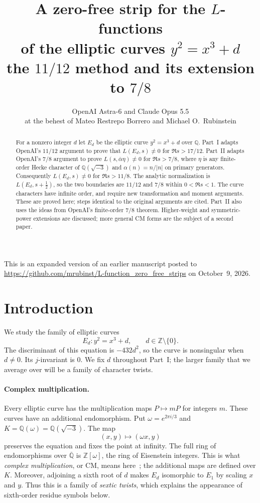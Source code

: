\documentclass[11pt]{article}
\title{A zero-free strip for the $L$-functions\\of the elliptic curves $y^2=x^3+d$\\[1ex]
{\large the $11/12$ method and its extension to $7/8$}}
\author{OpenAI Astra-6 \quad and \quad Claude Opus 5.5\\[1ex]
{\normalsize at the behest of Mateo Restrepo Borrero and Michael O.\ Rubinstein}}
\date{}
\numberwithin{equation}{section}
\newcommand{\OO}{\mathbb Z[\omega]}
\begin{document}
\maketitle
\begin{center}
\parbox{0.9\linewidth}{\small\centering This is an expanded version of an earlier manuscript posted to
\url{https://github.com/mrubinst/L-function_zero_free_strips} on October~9, 2026.}
\end{center}

\begin{abstract}
For a nonzero integer $d$ let $E_d$ be the elliptic curve
$y^2=x^3+d$ over $\mathbb Q$. Part~I adapts OpenAI's $11/12$
argument to prove that $L(E_d,s)\ne0$ for $\Re s>17/12$.
Part~II adapts OpenAI's $7/8$ argument to prove
$L(s,\overline\alpha\eta)\ne0$ for $\Re s>7/8$, where $\eta$ is any finite-order Hecke
character of $\mathbb Q(\sqrt{-3})$ and $\alpha(n)=n/|n|$ on primary generators.
Consequently $L(E_d,s)\ne0$ for $\Re s>11/8$.
The analytic normalization is $L(E_d,s+\frac12)$, so the two boundaries
are $11/12$ and $7/8$ within $0<\Re s<1$.
The curve characters have infinite order, and require new
transformation and moment arguments. These are proved here; steps identical to
the original arguments are cited. Part~II also uses the ideas from OpenAI's finite-order $7/8$
theorem.
Higher-weight and symmetric-power extensions are discussed; more general CM forms are the subject of a second paper.
\end{abstract}

\section*{Introduction}

We study the family of elliptic curves
\begin{equation}\label{eq:intro-curve}
 E_d\colon y^2=x^3+d,\qquad d\in\mathbb Z\setminus\{0\}.
\end{equation}
The discriminant of this equation is
$-432d^2$, so the curve is nonsingular when $d\ne0$. Its $j$-invariant is $0$.
We fix $d$ throughout Part~I; the larger family that we average over will be a family of character twists.

\paragraph{Complex multiplication.}
Every elliptic curve has the multiplication maps $P\mapsto mP$ for integers $m$.
These curves have an additional endomorphism. Put
$\omega=e^{2\pi i/3}$ and $K=\mathbb Q(\omega)=\mathbb Q(\sqrt{-3})$. The map
\begin{equation}\label{eq:intro-cm-map}
 (x,y)\longmapsto(\omega x,y)
\end{equation}
preserves the equation and fixes the point at infinity. The full ring of endomorphisms over
$\overline{\mathbb Q}$ is $\OO$, the ring of Eisenstein integers.
This is what \emph{complex multiplication}, or CM, means here~\cite{SilATAEC,Deuring}; the additional maps
are defined over $K$. Moreover, adjoining a sixth root of $d$ makes $E_d$ isomorphic to $E_1$ by
scaling $x$ and $y$. Thus this is a family of \emph{sextic twists}, which explains the appearance of
sixth-order residue symbols below.
\end{document}
